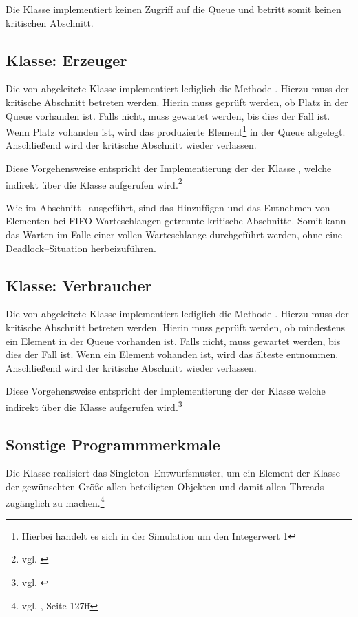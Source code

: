 Die Klasse  implementiert keinen Zugriff auf die Queue und betritt somit keinen kritischen Abschnitt.

\subsection{Klasse: Erzeuger} %
\label{sub:klasse_erzeuger}
Die von  abgeleitete Klasse  implementiert lediglich die Methode . Hierzu muss der kritische Abschnitt betreten werden. Hierin muss geprüft werden, ob Platz in der Queue vorhanden ist. Falls nicht, muss gewartet werden, bis dies der Fall ist. Wenn Platz vohanden ist, wird das produzierte Element\footnote{Hierbei handelt es sich in der Simulation um den Integerwert 1} in der Queue abgelegt. Anschließend wird der kritische Abschnitt wieder verlassen.

Diese Vorgehensweise entspricht der Implementierung der  der Klasse , welche indirekt über die Klasse  aufgerufen wird.\footnote{vgl. \cite{javadoc:lbqsourceput}}

Wie im Abschnitt~ ausgeführt, sind das Hinzufügen und das Entnehmen von Elementen bei \ac{FIFO} Warteschlangen getrennte kritische Abschnitte. Somit kann das Warten im Falle einer vollen Warteschlange durchgeführt werden, ohne eine Deadlock–Situation herbeizuführen.

\subsection{Klasse: Verbraucher} %
\label{sub:klasse_verbraucher}
Die von  abgeleitete Klasse  implementiert lediglich die Methode . Hierzu muss der kritische Abschnitt betreten werden. Hierin muss geprüft werden, ob mindestens ein Element in der Queue vorhanden ist. Falls nicht, muss gewartet werden, bis dies der Fall ist. Wenn ein Element vohanden ist, wird das älteste entnommen. Anschließend wird der kritische Abschnitt wieder verlassen.

Diese Vorgehensweise entspricht der Implementierung der  der Klasse  welche indirekt über die Klasse  aufgerufen wird.\footnote{vgl. \cite{javadoc:lbqsource}} 

\subsection{Sonstige Programmmerkmale} %
\label{sub:sonstige_programmmerkmale}
Die Klasse  realisiert das Singleton–Entwurfsmuster, um ein Element der Klasse  der gewünschten Größe allen beteiligten Objekten und damit allen Threads zugänglich zu machen.\footnote{vgl. \cite{gof}, Seite 127ff}

